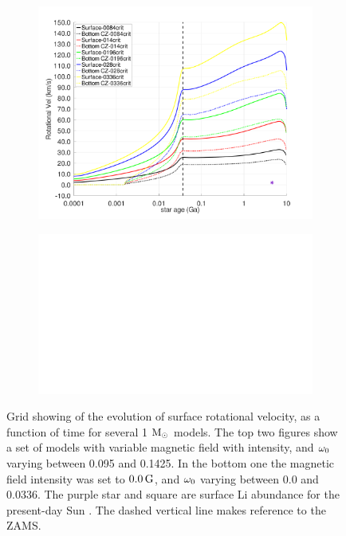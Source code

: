 \documentclass[fleqn,usenatbib]{mnras}
\begin{document}
\begin{figure}
\begin{subfigure}[h]{0.47\textwidth}
    \includegraphics[clip,width=\textwidth]{figures/paper2/rot_vel_var_vel_0_0g_0.pdf}
    \label{fig:subim23}
    \end{subfigure}    
    \begin{subfigure}[h]{0.47\textwidth}
    \includegraphics[width=\textwidth]{figures/blank.eps}
    \label{fig:subim24}
    \end{subfigure}
\caption{Grid showing of the evolution of surface rotational velocity, as a function of time for several 1 $\mathrm{M}_\odot$ models. The top two figures show a set of models with variable magnetic field with intensity, and $\omega_{\mathrm{0}}$ varying between 0.095 and 0.1425. In the bottom one the magnetic field intensity was set to $0.0\,\mathrm{G}$, and $\omega_{\mathrm{0}}$ varying between 0.0 and 0.0336. The purple star and square are surface Li abundance for the present-day Sun \citep{Asplund2009}. The dashed vertical line makes reference to the ZAMS.}
\label{fig:grid_li_var_g}
\end{figure}
\end{document}
